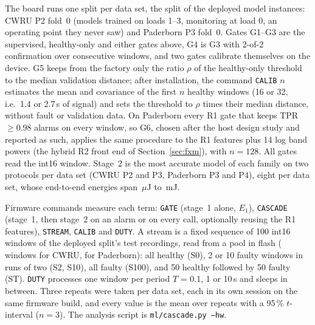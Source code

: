 \documentclass[conference]{IEEEtran}
\begin{document}
The board runs one split per data set, the split of the deployed model instances: CWRU P2 fold~0 (models trained on
loads 1--3, monitoring at load 0, an operating point they never saw) and Paderborn P3 fold~0. Gates G1--G3 are the
supervised, healthy-only and either gates above, G4 is G3 with 2-of-2 confirmation over consecutive windows, and two
gates calibrate themselves on the device. G5 keeps from the factory only the ratio $\rho$ of the healthy-only
threshold to the median validation distance; after installation, the command \texttt{CALIB} $n$ estimates the mean
and covariance of the first $n$ healthy windows (16 or 32, i.e.\ 1.4 or 2.7\,s of signal) and sets the threshold to
$\rho$ times their median distance, without fault or validation data. On Paderborn every R1 gate that keeps
TPR $\geq 0.98$ alarms on every window, so G6, chosen after the host design study and reported as such, applies the
same procedure to the R1 features plus 14 log band powers (the hybrid R2 front end of Section~\ref{sec:fxm}), with
$n = 128$. All gates read the int16 window. Stage~2 is the most accurate model of each family on two protocols per
data set (CWRU P2 and P3, Paderborn P3 and P4), eight per data set, whose end-to-end energies span
\NumChPuDtROneE{}\,$\mu$J to \NumChETwoMax{}\,mJ.

Firmware commands measure each term: \texttt{GATE} (stage~1 alone, $E_1$), \texttt{CASCADE} (stage~1, then stage~2
on an alarm or on every call, optionally reusing the R1 features), \texttt{STREAM}, \texttt{CALIB} and \texttt{DUTY}. A stream is a
fixed sequence of 100 int16 windows of the deployed split's test recordings, read from a pool in flash
(\NumChCwPool{} windows for CWRU, \NumChPuPool{} for Paderborn): all healthy (S0), 2 or 10 faulty windows in runs of
two (S2, S10), all faulty (S100), and 50 healthy followed by 50 faulty (ST). \texttt{DUTY} processes one window per
period $T$ = 0.1, 1 or 10\,s and sleeps in between. Three repeats were taken per data set, each in its own session on
the same firmware build, and every value is the mean over repeats with a 95\,\% $t$-interval ($n = 3$). The analysis
script is \texttt{ml/cascade.py --hw}.





\end{document}
